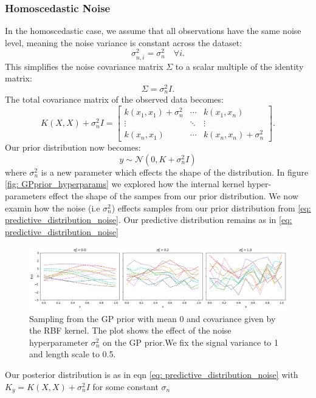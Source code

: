\documentclass[10pt]{article}
\begin{document}
\subsubsection*{Homoscedastic Noise} 

In the homoscedastic case, we assume that all observations have the same noise level, meaning the noise variance is constant across the dataset:
\[
\sigma_{n,i}^2 = \sigma_n^2 \quad \forall i.
\]
This simplifies the noise covariance matrix \( \Sigma \) to a scalar multiple of the identity matrix:
\[
\Sigma = \sigma_n^2 I.
\]
The total covariance matrix of the observed data becomes:
\[
K(X, X) + \sigma_n^2 I = 
\begin{bmatrix}
k(x_1, x_1) + \sigma_n^2 & \cdots & k(x_1, x_n) \\
\vdots & \ddots & \vdots \\
k(x_n, x_1) & \cdots & k(x_n, x_n) + \sigma_n^2
\end{bmatrix}.
\]
Our prior distribution now becomes:
\begin{equation}
y \sim \mathcal{N}(0, K+\sigma_n^2 I)
\label{eq: prior_withnoise}
\end{equation}
where $\sigma_n^2$ is a new parameter which effects the shape of the distribution. In figure \ref{fig: GPprior_hyperparams} we 
explored how the internal kernel hyper-parameters effect the shape of the sampes from our prior distribution. We now examin how the noise (i.e $\sigma_n^2$) effects samples from our prior distribution from \ref{eq:  predictive_distribution_noise}.
Our predictive distribution remains as in \ref{eq: predictive_distribution_noise}

\begin{figure}[H]
    \centering
        \includegraphics[width=\textwidth]{LatexPlots/1dplots/Kernel_noise.png}
        \caption{Sampling from the GP prior with mean 0 and covariance given by the RBF kernel.
        The plot shows the effect of the noise hyperparameter \(\sigma_n^2\) on the GP prior.We fix the signal variance to 1 and length scale to 0.5.}
    \label{fig: kernel_noise}
\end{figure}
\noindent
Our posterior distribution is as in eqn \ref{eq:  predictive_distribution_noise} with \(K_y = K(X, X) + \sigma_n^2 I \) for some constant \(\sigma_n\)
\end{document}
